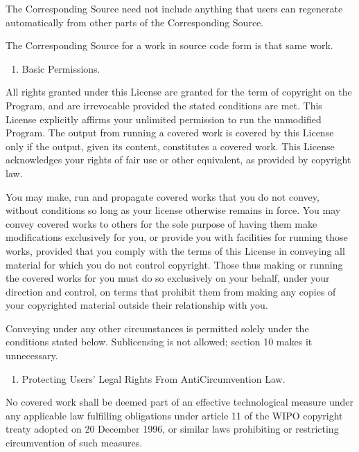\documentclass[letterpaper,10pt,english]{sphinxmanual}
\begin{document}
\sphinxAtStartPar
The Corresponding Source need not include anything that users can regenerate automatically from other parts of the Corresponding Source.

\sphinxAtStartPar
The Corresponding Source for a work in source code form is that same work.
\begin{enumerate}
%
\setcounter{enumi}{1}
\item {} 
\sphinxAtStartPar
Basic Permissions.

\end{enumerate}

\sphinxAtStartPar
All rights granted under this License are granted for the term of copyright on the Program, and are irrevocable provided the stated conditions are met. This License explicitly affirms your unlimited permission to run the unmodified Program. The output from running a covered work is covered by this License only if the output, given its content, constitutes a covered work. This License acknowledges your rights of fair use or other equivalent, as provided by copyright law.

\sphinxAtStartPar
You may make, run and propagate covered works that you do not convey, without conditions so long as your license otherwise remains in force. You may convey covered works to others for the sole purpose of having them make modifications exclusively for you, or provide you with facilities for running those works, provided that you comply with the terms of this License in conveying all material for which you do not control copyright. Those thus making or running the covered works for you must do so exclusively on your behalf, under your direction and control, on terms that prohibit them from making any copies of your copyrighted material outside their relationship with you.

\sphinxAtStartPar
Conveying under any other circumstances is permitted solely under the conditions stated below. Sublicensing is not allowed; section 10 makes it unnecessary.
\begin{enumerate}
%
\setcounter{enumi}{2}
\item {} 
\sphinxAtStartPar
Protecting Users’ Legal Rights From Anti\sphinxhyphen{}Circumvention Law.

\end{enumerate}

\sphinxAtStartPar
No covered work shall be deemed part of an effective technological measure under any applicable law fulfilling obligations under article 11 of the WIPO copyright treaty adopted on 20 December 1996, or similar laws prohibiting or restricting circumvention of such measures.
\end{document}
